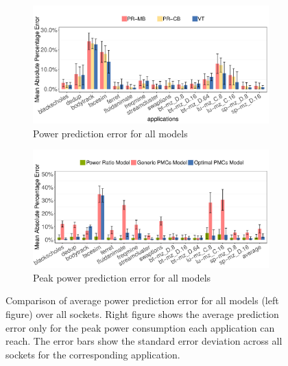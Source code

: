 \begin{figure}[ht!]
	\centering
	\begin{subfigure}[b]{.9\textwidth}
		\includegraphics[width=\textwidth]{power_aware_job_scheduling/figures/model_power_pred_error}
		\caption{Power prediction error for all models}
		\label{fig:model_power_pred_error}
	\end{subfigure}%
	
	\begin{subfigure}[b]{.9\textwidth}
		\includegraphics[width=\textwidth]{power_aware_job_scheduling/figures/model_peak_pred_error}
		\caption{Peak power prediction error for all models}
		\label{fig:model_peak_pred_error}
	\end{subfigure}%
	\caption{Comparison of average power prediction error for all models (left figure) over all sockets.  
					Right figure shows the average prediction error only for the peak power consumption each application can reach.  
					The error bars show the standard error deviation across all sockets for the corresponding application.}
					\vspace{.5cm}
\end{figure}

